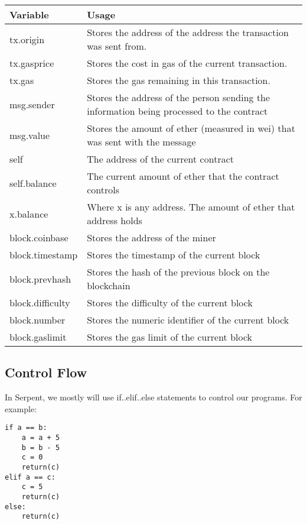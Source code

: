\documentclass[12pt]{article}
\begin{document}
\begin{center}
	\begin{tabular}{| l | p{9cm} |}
	\hline
	Variable & Usage \\ \hline
	tx.origin & Stores the address of the address the transaction was sent from. \\ \hline
	tx.gasprice & Stores the cost in gas of the current transaction. \\ \hline	
	tx.gas & Stores the gas remaining in this transaction. \\ \hline
	msg.sender & Stores the address of the person sending the information being processed to the contract \\ \hline
	msg.value & Stores the amount of ether (measured in wei) that was sent with the message \\ \hline
	self & The address of the current contract \\ \hline
	self.balance & The current amount of ether that the contract controls \\ \hline
	x.balance & Where x is any address. The amount of ether that address holds \\ \hline
	block.coinbase & Stores the address of the miner \\ \hline
	block.timestamp & Stores the timestamp of the current block \\ \hline
	block.prevhash & Stores the hash of the previous block on the blockchain \\ \hline
	block.difficulty & Stores the difficulty of the current block \\ \hline
	block.number & Stores the numeric identifier of the current block \\ \hline
	block.gaslimit & Stores the gas limit of the current block \\ \hline
	\end{tabular}
\end{center}

\subsection{Control Flow}

	In Serpent, we mostly will use if..elif..else statements to control our programs. For example:
	
\begin{lstlisting}
if a == b:
	a = a + 5
	b = b - 5
	c = 0
	return(c)
elif a == c: 
	c = 5
	return(c)
else:
	return(c)
\end{lstlisting}
\end{document}
